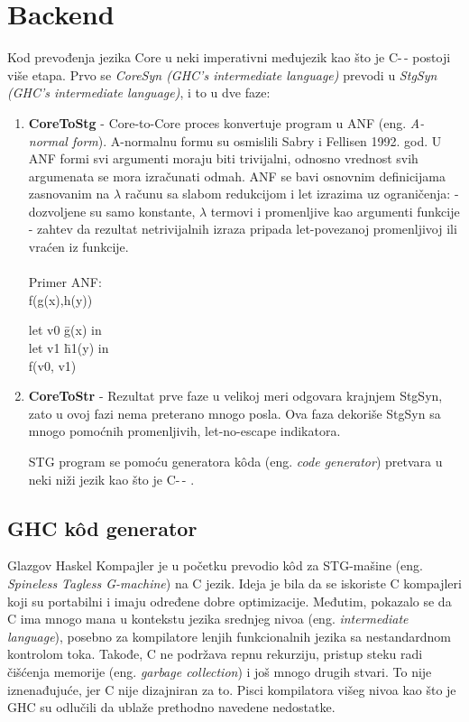 \section{Backend}
\label{sec:backend}

Kod prevođenja jezika Core u neki imperativni međujezik kao što je C-\,- postoji više etapa.
Prvo se \textit{CoreSyn (GHC’s intermediate language)} prevodi u \textit{StgSyn (GHC’s intermediate language)}, i to u dve faze:
\begin{enumerate}
	\item \textbf{CoreToStg} - Core-to-Core proces konvertuje program u ANF (eng. \emph{A-normal form}). A-normalnu formu su osmislili Sabry i Fellisen 1992. god.  U ANF formi svi argumenti moraju biti trivijalni, odnosno vrednost svih argumenata se mora izračunati odmah. ANF se bavi osnovnim definicijama zasnovanim na $\lambda$ računu sa slabom redukcijom i let izrazima uz ograničenja:
	- dozvoljene su samo konstante, $\lambda$ termovi i promenljive kao argumenti funkcije
	- zahtev da rezultat netrivijalnih izraza pripada let-povezanoj promenljivoj ili vraćen iz funkcije. \\ \\
	Primer ANF: \\ f(g(x),h(y))\\
	
	\begin{tabbing}
		let v0 \= g(x) in \\
		\>let v1 \= h1(y) in \\
		\> \> f(v0, v1)
	\end{tabbing}
	
	\item \textbf{CoreToStr} - Rezultat prve faze u velikoj meri odgovara krajnjem StgSyn, zato u ovoj fazi nema preterano mnogo posla. Ova faza dekoriše StgSyn sa mnogo pomoćnih  promenljivih, let-no-escape indikatora.
	
	STG program se pomoću generatora k\^{o}da (eng. \emph{code generator}) pretvara u neki niži jezik kao što je C-\,- \cite{C--05}.
	
\end{enumerate}

\subsection{GHC k\^{o}d generator}
\label{sec:podnaslovGHCGenerator}

Glazgov Haskel Kompajler je u početku prevodio k\^{o}d za STG-mašine (eng. \emph{Spineless Tagless G-machine}) na C jezik. Ideja je bila da se iskoriste C kompajleri koji su portabilni i imaju određene dobre optimizacije. Međutim, pokazalo se da C ima mnogo mana u kontekstu jezika srednjeg nivoa (eng. \emph {intermediate language}), posebno za kompilatore lenjih funkcionalnih jezika sa nestandardnom kontrolom toka. Takođe, C ne podržava repnu rekurziju, pristup steku radi čišćenja memorije (eng. \emph{garbage collection}) i još mnogo drugih stvari. To nije iznenađujuće, jer C nije dizajniran za to. Pisci kompilatora višeg nivoa kao što je GHC su odlučili da ublaže prethodno navedene nedostatke.

